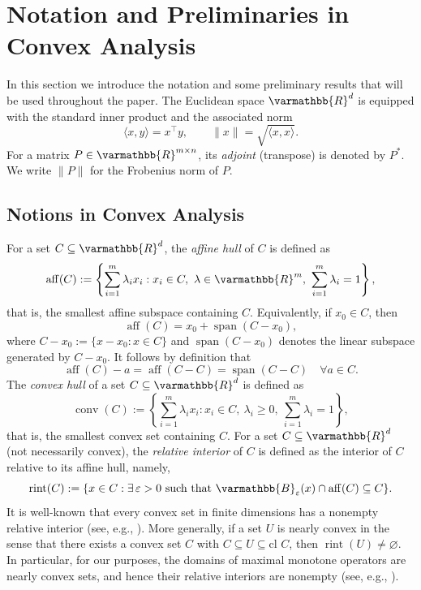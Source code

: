 \documentclass[11pt,reqno]{article}
\let\mathbb=\varmathbb
\newcommand{\R}{\mathbb{R}}
\newcommand{\cl}{{\text{cl }}}
\newcommand{\1}{\mathds{1}}
\numberwithin{equation}{section}  %
\theoremstyle{plain}
\theoremstyle{definition}
\theoremstyle{remark}
\numberwithin{theorem}{section}
\numberwithin{remark}{section}
\numberwithin{example}{section}
\begin{document}
\section{Notation and Preliminaries in Convex Analysis}\label{Section2}

In this section we introduce the notation and some preliminary results that will be used throughout the paper. 
The Euclidean space $\mathbb{R}^d$ is equipped with the standard inner product and the associated norm
\[
  \langle x,y\rangle = x^\top y, 
  \qquad \|x\| = \sqrt{\langle x,x\rangle}.
\]
For a matrix $P \in \mathbb{R}^{m \times n}$, its \emph{adjoint} (transpose) is denoted by $P^\ast$. 
We write $\|P\|$ for the Frobenius norm of $P$.

\subsection{Notions in Convex Analysis}



For a set $C \subseteq \mathbb{R}^d$, the \emph{affine hull} of $C$ is defined as
\[
  \operatorname{aff}(C) := \left\{ \sum_{i=1}^m \lambda_i x_i : x_i \in C,\ \lambda \in \mathbb{R}^m,\ \sum_{i=1}^m \lambda_i = 1 \right\},
\]
that is, the smallest affine subspace containing $C$. Equivalently, if $x_0 \in C$, then
\[
  \operatorname{aff}(C) = x_0 + \operatorname{span}(C - x_0),
\]
where $C - x_0 := \{x - x_0 : x \in C\}$ and $\operatorname{span}(C - x_0)$ denotes the linear subspace generated by $C - x_0$. It follows by definition that
\begin{equation}\label{eqaff}
\operatorname{aff}(C) - a = \operatorname{aff}(C-C) = \operatorname{span}(C - C) 
\quad \forall a \in C .
\end{equation}
The \emph{convex hull} of a set $C \subseteq \mathbb{R}^d$ is defined as
\[
    \operatorname{conv}(C) := \left\{ \sum_{i=1}^m \lambda_i x_i : x_i \in C,\ \lambda_i \geq 0,\ \sum_{i=1}^m \lambda_i = 1 \right\},
\]
that is, the smallest convex set containing $C$. For a set $C \subseteq \R^d$ (not necessarily convex), the \emph{relative interior} of $C$ is defined as the interior of $C$ relative to its affine hull, namely,  
\[
    \operatorname{rint}(C) := \{x \in C : \exists \,\varepsilon > 0 \text{ such that } \mathbb{B}_\varepsilon(x) \cap \operatorname{aff}(C) \subseteq C \}.
\]
It is well-known that every convex set in finite dimensions has a nonempty relative interior (see, e.g., \cite[Proposition 2.40]{MR1491362}). More generally, if a set $U$ is nearly convex in the sense that there exists a convex set $C$ with $C \subseteq U \subseteq \cl C$, then $\operatorname{rint}(U) \neq \varnothing$. In particular, for our purposes, the domains of maximal monotone operators are nearly convex sets, and hence their relative interiors are nonempty (see, e.g., \cite[Theorem 12.41]{MR1491362}).
\end{document}
